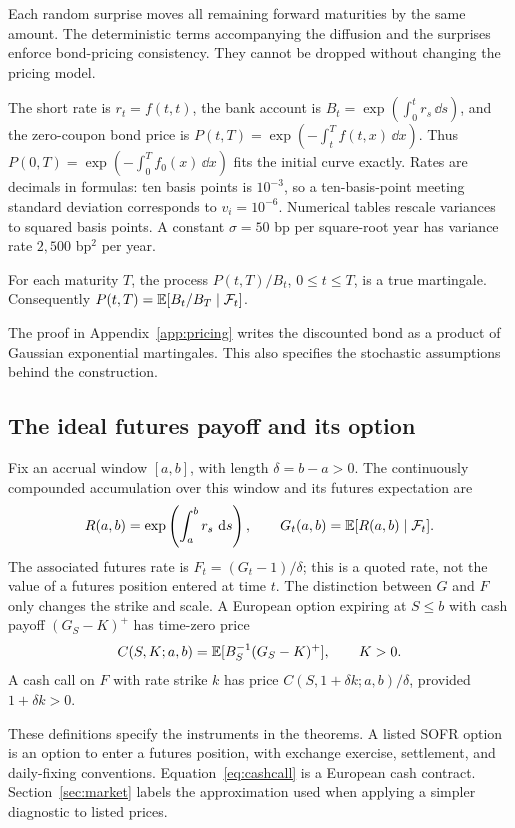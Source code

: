 Each random surprise moves all remaining forward maturities by the same amount. The deterministic terms accompanying the diffusion and the surprises enforce bond-pricing consistency. They cannot be dropped without changing the pricing model.

The short rate is $r_t=f(t,t)$, the bank account is $B_t=\exp(\int_0^t r_s\,\dd s)$, and the zero-coupon bond price is $P(t,T)=\exp(-\int_t^T f(t,x)\,\dd x)$. Thus $P(0,T)=\exp(-\int_0^T f_0(x)\,\dd x)$ fits the initial curve exactly. Rates are decimals in formulas: ten basis points is $10^{-3}$, so a ten-basis-point meeting standard deviation corresponds to $v_i=10^{-6}$. Numerical tables rescale variances to squared basis points. A constant $\sigma=50$ bp per square-root year has variance rate $2{,}500$ bp$^2$ per year.

\begin{proposition}\label{prop:bond}
For each maturity $T$, the process $P(t,T)/B_t$, $0\leq t\leq T$, is a true martingale. Consequently $P(t,T)=\mathbb E[B_t/B_T\mid\mathcal F_t]$.
\end{proposition}
The proof in Appendix~\ref{app:pricing} writes the discounted bond as a product of Gaussian exponential martingales. This also specifies the stochastic assumptions behind the construction.

\subsection{The ideal futures payoff and its option}
Fix an accrual window $[a,b]$, with length $\delta=b-a>0$. The continuously compounded accumulation over this window and its futures expectation are
\begin{equation}\label{eq:futures}
R(a,b)=\exp\left(\int_a^b r_s\,\,\mathrm d s\right),\qquad
G_t(a,b)=\mathbb E[R(a,b)\mid\mathcal F_t].
\end{equation}
The associated futures rate is $F_t=(G_t-1)/\delta$; this is a quoted rate, not the value of a futures position entered at time $t$. The distinction between $G$ and $F$ only changes the strike and scale. A European option expiring at $S\leq b$ with cash payoff $(G_S-K)^+$ has time-zero price
\begin{equation}\label{eq:cashcall}
C(S,K;a,b)=\mathbb E[B_S^{-1}(G_S-K)^+],\qquad K>0.
\end{equation}
A cash call on $F$ with rate strike $k$ has price $C(S,1+\delta k;a,b)/\delta$, provided $1+\delta k>0$.

These definitions specify the instruments in the theorems. A listed SOFR option is an option to enter a futures position, with exchange exercise, settlement, and daily-fixing conventions. Equation~\eqref{eq:cashcall} is a European cash contract. Section~\ref{sec:market} labels the approximation used when applying a simpler diagnostic to listed prices.

